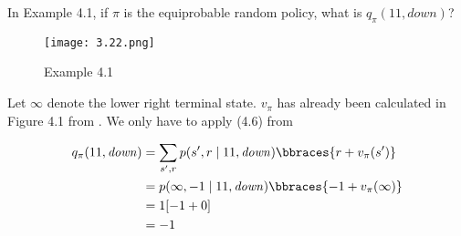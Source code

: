 
\begin{exercise}[Exercise 4.1]

In Example 4.1, if $\pi$ is the equiprobable random policy, what is $q_\pi(11, \mathit{down})$?

\begin{figure}[H]
    \centering
    \texttt{[image: 3.22.png]}
    \caption{Example 4.1}
    \label{fig:3.22.1}
\end{figure}

\end{exercise}


\begin{solution}

Let $\infty$ denote the lower right terminal state.
$v_\pi$ has already been calculated in Figure 4.1 from \cite*[page 77]{SuttonRichardS2018Rl:a}.
We only have to apply (4.6) from \cite*[page 78]{SuttonRichardS2018Rl:a}

\begin{align*}
    q_\pi(11, \mathit{down})
    & =
    \sum_{s^\prime, r}
        p(s^\prime, r \mid 11, \mathit{down})
        \bbraces{r + v_\pi(s^\prime)} \\
    & =
    p(\infty, -1 \mid 11, \mathit{down})
    \bbraces{-1 + v_\pi(\infty)} \\
    & =
    1 [-1 + 0] \\
    & =
    -1
\end{align*}

\end{solution}

